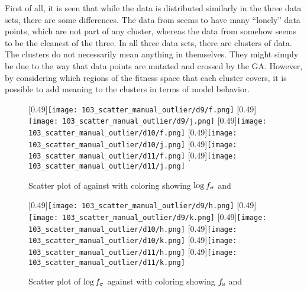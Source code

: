 First of all, it is seen that while the data is distributed similarly in the three data sets, there are some differences. The data from \dnine{} seems to have many ``lonely'' data points, which are not part of any cluster, whereas the data from \dten{} somehow seems to be the cleanest of the three. In all three data sets, there are clusters of data. The clusters do not necessarily mean anything in themselves. They might simply be due to the way that data points are mutated and crossed by the GA. However, by considering which regions of the fitness space that each cluster covers, it is possible to add meaning to the clusters in terms of model behavior.

\begin{figure}
\centering
{}[0.49\linewidth]{\texttt{[image: 103\_scatter\_manual\_outlier/d9/f.png]}}
[0.49\linewidth]{\texttt{[image: 103\_scatter\_manual\_outlier/d9/j.png]}}
[0.49\linewidth]{\texttt{[image: 103\_scatter\_manual\_outlier/d10/f.png]}}
[0.49\linewidth]{\texttt{[image: 103\_scatter\_manual\_outlier/d10/j.png]}}
[0.49\linewidth]{\texttt{[image: 103\_scatter\_manual\_outlier/d11/f.png]}}
[0.49\linewidth]{\texttt{[image: 103\_scatter\_manual\_outlier/d11/j.png]}}
\caption{Scatter plot of \roundstable{} against \timetoreachnewfundamental{} with coloring showing $\log f_\sigma$ and \overshoot}
\label{figure:scatter_fitness_inliers_a}
\end{figure}

\begin{figure}
\centering
{}[0.49\linewidth]{\texttt{[image: 103\_scatter\_manual\_outlier/d9/h.png]}}
[0.49\linewidth]{\texttt{[image: 103\_scatter\_manual\_outlier/d9/k.png]}}
[0.49\linewidth]{\texttt{[image: 103\_scatter\_manual\_outlier/d10/h.png]}}
[0.49\linewidth]{\texttt{[image: 103\_scatter\_manual\_outlier/d10/k.png]}}
[0.49\linewidth]{\texttt{[image: 103\_scatter\_manual\_outlier/d11/h.png]}}
[0.49\linewidth]{\texttt{[image: 103\_scatter\_manual\_outlier/d11/k.png]}}
\caption{Scatter plot of $\log f_\sigma$ against \timetoreachnewfundamental{} with coloring showing $f_\text{s}$ and \overshoot}
\label{figure:scatter_fitness_inliers_b}
\end{figure}



